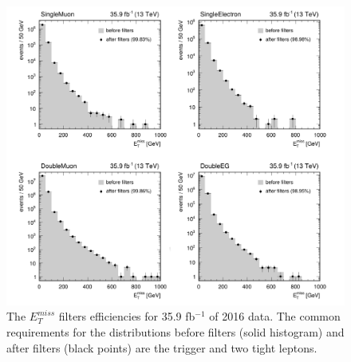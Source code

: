 \begin{figure}
\centering
\includegraphics[scale= 0.8]{../Cap4/met}
\caption{The  $E_T^{miss}$ filters efficiencies for 35.9 fb$^{-1}$ of 2016 data. The common requirements for
the distributions before filters (solid histogram) and after filters (black points) are the trigger
and two tight leptons.}
\label{met}
\end{figure}

